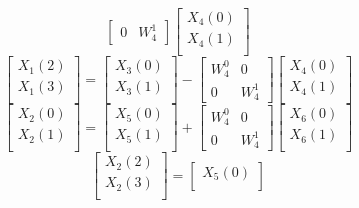 \documentclass[journal,12pt,twocolumn]{IEEEtran}
\renewcommand\thesection{\arabic{section}}
\begin{document}
\begin{enumerate}[label=\arabic*.,ref=\thesection.\theenumi]
\begin{equation}
\begin{bmatrix}
0 & W^{1}_{4}
\end{bmatrix}
\begin{bmatrix}
X_{4}(0) \\ 
X_{4}(1) \\ 
\end{bmatrix}
\end{equation}
\begin{equation}
\begin{bmatrix}
X_{1}(2) \\ 
X_{1}(3)\\ 
\end{bmatrix}
=
\begin{bmatrix}
X_{3}(0) \\ 
X_{3}(1)\\ 
\end{bmatrix}
-
\begin{bmatrix}
W^{0}_{4} & 0\\
0 & W^{1}_{4}
\end{bmatrix}
\begin{bmatrix}
X_{4}(0) \\ 
X_{4}(1) \\ 
\end{bmatrix}
\end{equation}
\begin{equation}
\begin{bmatrix}
X_{2}(0) \\ 
X_{2}(1)\\ 
\end{bmatrix}
=
\begin{bmatrix}
X_{5}(0) \\ 
X_{5}(1)\\ 
\end{bmatrix}
+
\begin{bmatrix}
W^{0}_{4} & 0\\
0 & W^{1}_{4}
\end{bmatrix}
\begin{bmatrix}
X_{6}(0) \\ 
X_{6}(1) \\ 
\end{bmatrix}
\end{equation}
\begin{equation}
\begin{bmatrix}
X_{2}(2) \\ 
X_{2}(3)\\ 
\end{bmatrix}
=
\begin{bmatrix}
X_{5}(0) \\ 

\end{bmatrix}
\end{equation}
\end{enumerate}
\end{document}
